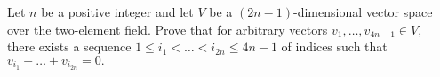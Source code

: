 Let $n$ be a positive integer and let $V$ be a $(2n-1)$-dimensional vector space over the two-element field. Prove that for arbitrary vectors $v_1,\dots,v_{4n-1} \in V,$ there exists a sequence $1\leq i_1<\dots<i_{2n}\leq 4n-1$ of indices such that $v_{i_1}+\dots+v_{i_{2n}}=0.$